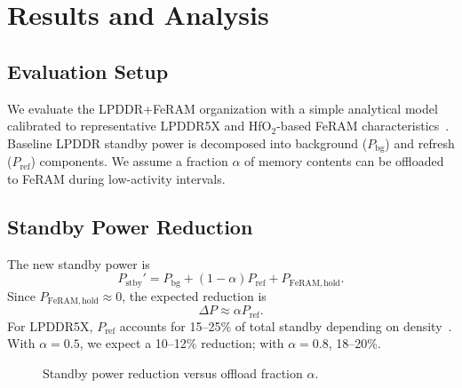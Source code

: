 \section{Results and Analysis}

\subsection{Evaluation Setup}
We evaluate the LPDDR+FeRAM organization with a simple analytical model calibrated to representative LPDDR5X
and HfO$_2$-based FeRAM characteristics~\cite{ChoiIEDM2022,KimIEDM2021}.
Baseline LPDDR standby power is decomposed into background ($P_{\mathrm{bg}}$) and refresh ($P_{\mathrm{ref}}$) components.
We assume a fraction $\alpha$ of memory contents can be offloaded to FeRAM during low-activity intervals.

\subsection{Standby Power Reduction}
The new standby power is
\[
P_{\mathrm{stby}}' = P_{\mathrm{bg}} + (1-\alpha) P_{\mathrm{ref}} + P_{\mathrm{FeRAM,hold}}.
\]
Since $P_{\mathrm{FeRAM,hold}} \approx 0$, the expected reduction is
\[
\Delta P \approx \alpha P_{\mathrm{ref}}.
\]
For LPDDR5X, $P_{\mathrm{ref}}$ accounts for 15--25\% of total standby depending on density~\cite{ChoiIEDM2022}.
With $\alpha=0.5$, we expect a 10--12\% reduction; with $\alpha=0.8$, 18--20\%.

\begin{figure}[t]
  \centering
  \vspace{-1ex}
  \caption{Standby power reduction versus offload fraction $\alpha$.}
  \label{fig:standby_reduction}
\end{figure}

